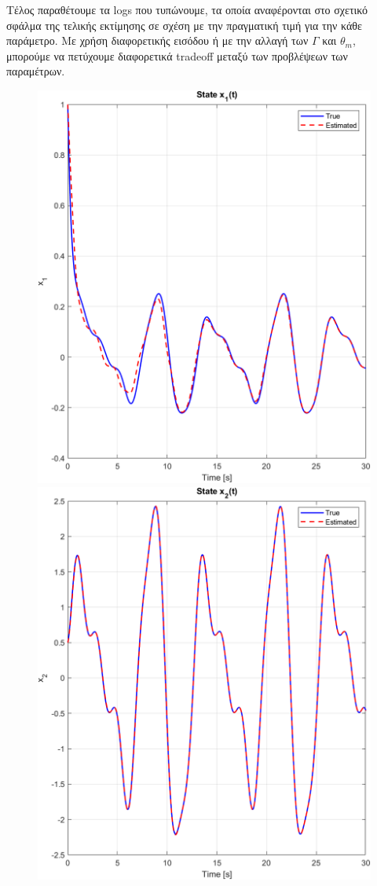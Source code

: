 \documentclass[12pt]{article} %
\numberwithin{equation}{section}  %
\begin{document}
Τέλος παραθέτουμε τα logs που τυπώνουμε, τα οποία αναφέρονται στο σχετικό σφάλμα της τελικής εκτίμησης σε σχέση με την πραγματική τιμή για την κάθε παράμετρο. 
Με χρήση διαφορετικής εισόδου ή με την αλλαγή των $\Gamma$ και $\theta_m$, μπορούμε να πετύχουμε διαφορετικά tradeoff μεταξύ των προβλέψεων των παραμέτρων.
\begin{figure}[ht!]
    \centering
    \begin{minipage}{0.48\textwidth}
        \centering
        \includegraphics[width=0.8\linewidth]{plots/plot1_a_x1.png}
    \end{minipage}
    \hfill
    \begin{minipage}{0.48\textwidth}
        \centering
        \includegraphics[width=0.8\linewidth]{plots/plot1_b_x2.png}
    \end{minipage}
    
    \caption{}
    \label{fig:x_est}
\end{figure}
\end{document}
